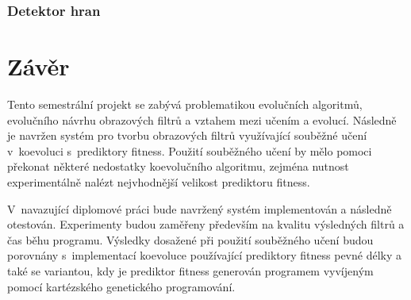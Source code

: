 \subsection{Detektor hran}



\chapter{Závěr}
\label{chConclusions}

Tento semestrální projekt se zabývá problematikou evolučních algoritmů, evolučního návrhu obrazových filtrů a vztahem mezi učením a evolucí. Následně je navržen systém pro tvorbu obrazových filtrů využívající souběžné učení v~koevoluci s~prediktory fitness. Použití souběžného učení by mělo pomoci překonat některé nedostatky koevolučního algoritmu, zejména nutnost experimentálně nalézt nejvhodnější velikost prediktoru fitness.


V~navazující diplomové práci bude navržený systém implementován a následně otestován. Experimenty budou zaměřeny především na kvalitu výsledných filtrů a čas běhu programu. Výsledky dosažené při použití souběžného učení budou porovnány s~implementací koevoluce používající prediktory fitness pevné délky a také se variantou, kdy je prediktor fitness generován programem vyvíjeným pomocí kartézského genetického programování.

